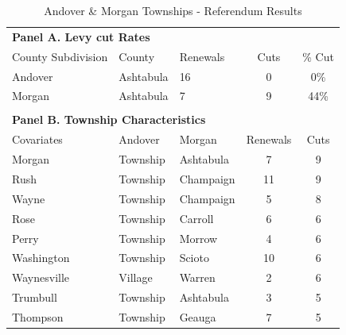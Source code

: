 \begin{table}[ht]
    \centering
    \caption{Andover \& Morgan Townships - Referendum Results}
    \label{tab:renewals_cuts}
    \begin{threeparttable}
    \begin{tabular}{p{4cm}p{3cm}p{3cm}cc}
        \hline
        \multicolumn{5}{l}{\textbf{Panel A. Levy cut Rates}} \\
        County Subdivision  & County & Renewals & Cuts & \% Cut  \\
        \hline
        Andover & Ashtabula & 16 & 0 & 0\% \\
        Morgan & Ashtabula & 7 & 9 & 44\% \\
        \\
        \hline
        \multicolumn{5}{l}{\textbf{Panel B. Township Characteristics}} \\
        Covariates & Andover & Morgan & Renewals & Cuts \\
        \hline
        Morgan & Township & Ashtabula & 7 & 9 \\
        Rush & Township & Champaign & 11 & 9 \\
        Wayne & Township & Champaign & 5 & 8 \\
        Rose & Township & Carroll & 6 & 6 \\
        Perry & Township & Morrow & 4 & 6 \\
        Washington & Township & Scioto & 10 & 6 \\
        Waynesville & Village & Warren & 2 & 6 \\
        Trumbull & Township & Ashtabula & 3 & 5 \\
        Thompson & Township & Geauga & 7 & 5 \\

\end{tabular}
\end{threeparttable}
\end{table}
